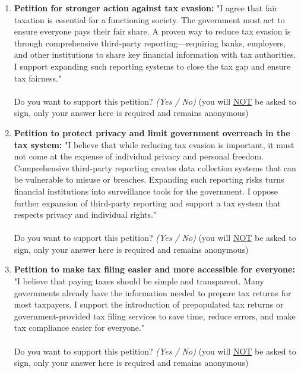 \documentclass[11pt]{article}
\begin{document}
\begin{enumerate}[resume]
    \begin{enumerate}[label=\alph*)]
        \item \textbf{Petition for stronger action against tax evasion:} "I agree that fair taxation is essential for a functioning society. The government must act to ensure everyone pays their fair share. A proven way to reduce tax evasion is through comprehensive third-party reporting---requiring banks, employers, and other institutions to share key financial information with tax authorities. I support expanding such reporting systems to close the tax gap and ensure tax fairness." \\ \\
        Do you want to support this petition? \textit{(Yes / No)} (you will \underline{NOT} be asked to sign, only your answer here is required and remains anonymous)\\
        \item \textbf{Petition to protect privacy and limit government overreach in the tax system:} "I believe that while reducing tax evasion is important, it must not come at the expense of individual privacy and personal freedom. Comprehensive third-party reporting creates data collection systems that can be vulnerable to misuse or breaches. Expanding such reporting risks turns financial institutions into surveillance tools for the government. I oppose further expansion of third-party reporting and support a tax system that respects privacy and individual rights."\\ \\
        Do you want to support this petition? \textit{(Yes / No)} (you will \underline{NOT} be asked to sign, only your answer here is required and remains anonymous) \\
        \item \textbf{Petition to make tax filing easier and more accessible for everyone:} "I believe that paying taxes should be simple and transparent. Many governments already have the information needed to prepare tax returns for most taxpayers. I support the introduction of prepopulated tax returns or government-provided tax filing services to save time, reduce errors, and make tax compliance easier for everyone."\\ \\
        Do you want to support this petition? \textit{(Yes / No)} (you will \underline{NOT} be asked to sign, only your answer here is required and remains anonymous)
    \end{enumerate}
\end{enumerate}   
\end{document}
